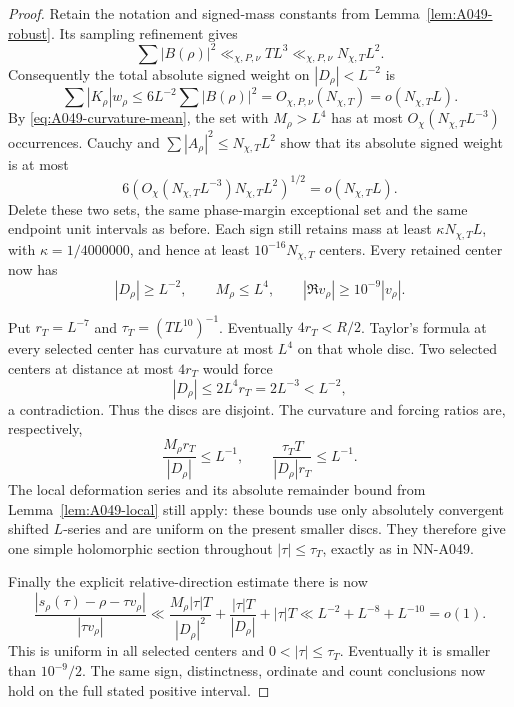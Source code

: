 \begin{proof}
Retain the notation and signed-mass constants from
Lemma~\ref{lem:A049-robust}. Its sampling refinement gives
\[
                 \sum|B(\rho)|^2\ll_{\chi,P,\nu}TL^3
                                               \ll_{\chi,P,\nu}N_{\chi,T}L^2.
\]
Consequently the total absolute signed weight on
\(|D_\rho|<L^{-2}\) is
\[
       \sum |K_\rho|w_\rho
       \le6L^{-2}\sum|B(\rho)|^2
                         =O_{\chi,P,\nu}(N_{\chi,T})
                         =o(N_{\chi,T}L).
\]
By \eqref{eq:A049-curvature-mean}, the set with
\(M_\rho>L^4\) has at most \(O_\chi(N_{\chi,T}L^{-3})\)
occurrences. Cauchy and
\(\sum|A_\rho|^2\le N_{\chi,T}L^2\) show that its
absolute signed weight is at most
\[
 6\left(O_\chi(N_{\chi,T}L^{-3})
                       N_{\chi,T}L^2\right)^{1/2}
                              =o(N_{\chi,T}L).
\]
Delete these two sets, the same phase-margin exceptional
set and the same endpoint unit intervals as before.
Each sign still retains mass at least
\(\kappa N_{\chi,T}L\), with \(\kappa=1/4000000\),
and hence at least \(10^{-16}N_{\chi,T}\) centers.
Every retained center now has
\[
 |D_\rho|\ge L^{-2},\qquad
 M_\rho\le L^4,\qquad
 |\Re v_\rho|\ge10^{-9}|v_\rho|.
\]

Put \(r_T=L^{-7}\) and \(\tau_T=(TL^{10})^{-1}\).
Eventually \(4r_T<R/2\). Taylor's formula at every selected
center has curvature at most \(L^4\) on that whole disc.
Two selected centers at distance at most \(4r_T\) would
force
\[
                  |D_\rho|\le2L^4r_T=2L^{-3}<L^{-2},
\]
a contradiction. Thus the discs are disjoint.
The curvature and forcing ratios are, respectively,
\[
 \frac{M_\rho r_T}{|D_\rho|}\le L^{-1},\qquad
 \frac{\tau_T T}{|D_\rho|r_T}\le L^{-1}.
\]
The local deformation series and its absolute remainder
bound from Lemma~\ref{lem:A049-local} still apply: these
bounds use only absolutely convergent shifted \(L\)-series
and are uniform on the present smaller discs.
They therefore give one simple holomorphic section
throughout \(|\tau|\le\tau_T\), exactly as in NN-A049.

Finally the explicit relative-direction estimate there is
now
\[
 \frac{|s_\rho(\tau)-\rho-\tau v_\rho|}
      {|\tau v_\rho|}
 \ll \frac{M_\rho|\tau|T}{|D_\rho|^2}
             +\frac{|\tau|T}{|D_\rho|}+|\tau|T
 \ll L^{-2}+L^{-8}+L^{-10}=o(1).
\]
This is uniform in all selected centers and
\(0<|\tau|\le\tau_T\). Eventually it is smaller than
\(10^{-9}/2\). The same sign, distinctness, ordinate and
count conclusions now hold on the full stated positive
interval.
\end{proof}


